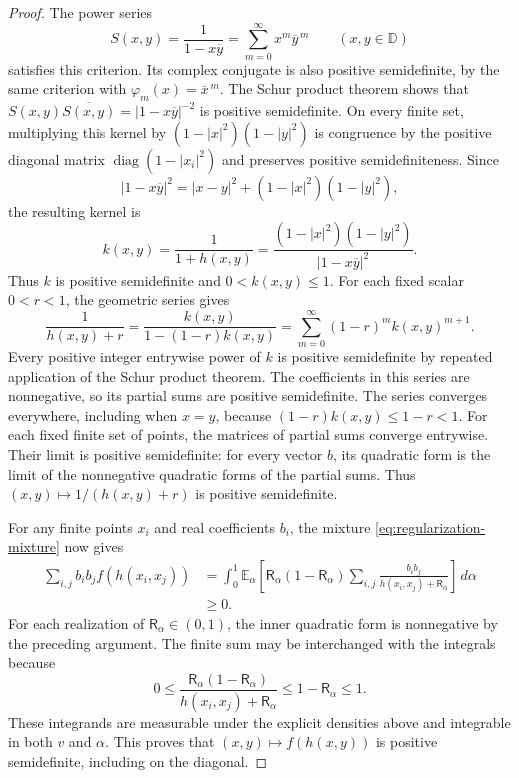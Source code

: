 \begin{proof}
The power series
\[
 S(x,y)=\frac1{1-x\overline y}
       =\sum_{m=0}^\infty x^m\overline y^{\,m}
 \qquad(x,y\in\mathbb D)
\]
satisfies this criterion. Its complex conjugate is also positive
semidefinite, by the same criterion with $\varphi_m(x)=\overline x^{\,m}$.
The Schur product theorem shows that
$S(x,y)\overline{S(x,y)}=|1-x\overline y|^{-2}$ is positive
semidefinite. On every finite set, multiplying this kernel by
$(1-|x|^2)(1-|y|^2)$ is congruence by the positive diagonal matrix
$\operatorname{diag}(1-|x_i|^2)$ and preserves positive
semidefiniteness. Since
\[
 |1-x\overline y|^2
 =|x-y|^2+(1-|x|^2)(1-|y|^2),
\]
the resulting kernel is
\[
 k(x,y)=\frac1{1+h(x,y)}
       =\frac{(1-|x|^2)(1-|y|^2)}{|1-x\overline y|^2}.
\]
Thus $k$ is positive semidefinite and $0<k(x,y)\le1$.
For each fixed scalar $0<r<1$, the geometric series gives
\begin{equation}\label{eq:regularization-geometric-series}
 \frac1{h(x,y)+r}
 =\frac{k(x,y)}{1-(1-r)k(x,y)}
 =\sum_{m=0}^\infty(1-r)^m k(x,y)^{m+1}.
\end{equation}
Every positive integer entrywise power of $k$ is positive
semidefinite by repeated application of the Schur product theorem.
The coefficients in this series are nonnegative, so its partial
sums are positive semidefinite. The series converges everywhere,
including when $x=y$, because $(1-r)k(x,y)\le1-r<1$.
For each fixed finite set of points, the matrices of partial sums
converge entrywise. Their limit is positive semidefinite: for every
vector $b$, its quadratic form is the limit of the nonnegative
quadratic forms of the partial sums. Thus
$(x,y)\mapsto1/(h(x,y)+r)$ is positive semidefinite.

For any finite points $x_i$ and real coefficients $b_i$, the mixture
\cref{eq:regularization-mixture} now gives
\[
 \begin{aligned}
 \sum_{i,j}b_i b_j f(h(x_i,x_j))
 &=\int_0^1\mathbb E_\alpha\left[
   \mathsf R_\alpha(1-\mathsf R_\alpha)
   \sum_{i,j}\frac{b_i b_j}{h(x_i,x_j)+\mathsf R_\alpha}
   \right]\,d\alpha\\
 &\ge0.
 \end{aligned}
\]
For each realization of $\mathsf R_\alpha\in(0,1)$, the inner
quadratic form is nonnegative by the preceding argument.
The finite sum may be interchanged with the integrals because
\[
 0\le\frac{\mathsf R_\alpha(1-\mathsf R_\alpha)}
                {h(x_i,x_j)+\mathsf R_\alpha}
 \le1-\mathsf R_\alpha\le1.
\]
These integrands are measurable under the explicit densities above
and integrable in both $v$ and $\alpha$. This proves that
$(x,y)\mapsto f(h(x,y))$ is positive semidefinite, including on
the diagonal.


\end{proof}
